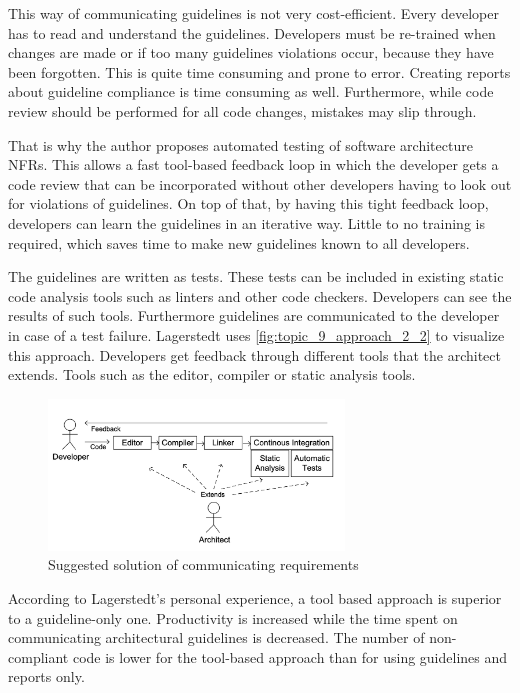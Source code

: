 This way of communicating guidelines is not very cost-efficient.
Every developer has to read and understand the guidelines. Developers must be re-trained when changes are made or if too many guidelines violations occur, because they have been forgotten.
This is quite time consuming and prone to error.  Creating reports about guideline compliance is time consuming as well.
Furthermore, while code review should be performed for all code changes, mistakes may slip through.

That is why the author proposes automated testing of software architecture NFRs.
This allows a fast tool-based feedback loop in which the developer gets a code review that can be incorporated without other developers having to look out for violations of guidelines.
On top of that, by having this tight feedback loop, developers can learn the guidelines in an iterative way.
Little to no training is required, which saves time to make new guidelines known to all developers.

The guidelines are written as tests. These tests can be included in existing static code analysis tools such as linters and other code checkers. Developers can see the results of such tools.
Furthermore guidelines are communicated to the developer in case of a test failure.
Lagerstedt uses \autoref{fig:topic_9_approach_2_2} to visualize this approach.
Developers get feedback through different tools that the architect extends. Tools such as the editor, compiler or static analysis tools.

\begin{figure}[htbp]
	\centering
	\includegraphics[width=0.7\textwidth]{../images/topic_9_approach_2_2.png}
	\caption{Suggested solution of communicating requirements~\cite{Lagerstedt2014}}
	\label{fig:topic_9_approach_2_2}
\end{figure}

According to Lagerstedt's personal experience, a tool based approach is superior to a guideline-only one.
Productivity is increased while the time spent on communicating architectural guidelines is decreased.
The number of non-compliant code is lower for the tool-based approach than for using guidelines and reports only.


